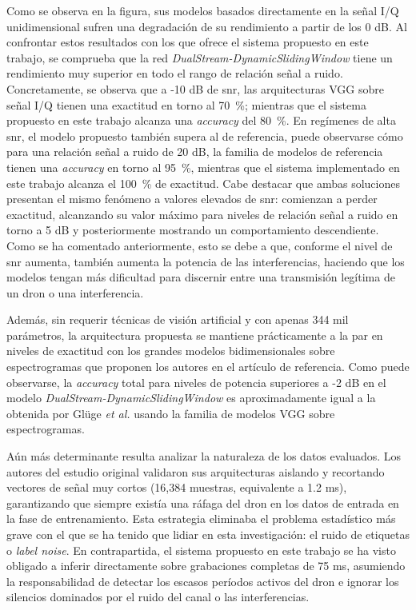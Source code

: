 Como se observa en la figura, sus modelos basados directamente en la señal I/Q unidimensional sufren una degradación de su rendimiento a partir de los 0 dB. Al confrontar estos resultados con los que ofrece el sistema propuesto en este trabajo, se comprueba que la red \textit{DualStream-DynamicSlidingWindow} tiene un rendimiento muy superior en todo el rango de relación señal a ruido. Concretamente, se observa que a -10 dB de \gls{snr}, las arquitecturas VGG sobre señal I/Q tienen una exactitud en torno al 70~\%; mientras que el sistema propuesto en este trabajo alcanza una \textit{accuracy} del 80~\%. En regímenes de alta \gls{snr}, el modelo propuesto también supera al de referencia, puede observarse cómo para una relación señal a ruido de 20 dB, la familia de modelos de referencia tienen una \textit{accuracy} en torno al 95~\%, mientras que el sistema implementado en este trabajo alcanza el 100~\% de exactitud. Cabe destacar que ambas soluciones presentan el mismo fenómeno a valores elevados de \gls{snr}: comienzan a perder exactitud, alcanzando su valor máximo para niveles de relación señal a ruido en torno a 5 dB y posteriormente mostrando un comportamiento descendiente. Como se ha comentado anteriormente, esto se debe a que, conforme el nivel de \gls{snr} aumenta, también aumenta la potencia de las interferencias, haciendo que los modelos tengan más dificultad para discernir entre una transmisión legítima de un dron o una interferencia. 

Además, sin requerir técnicas de visión artificial y con apenas 344 mil parámetros, la arquitectura propuesta se mantiene prácticamente a la par en niveles de exactitud con los grandes modelos bidimensionales sobre espectrogramas que proponen los autores en el artículo de referencia. Como puede observarse, la \textit{accuracy} total para niveles de potencia superiores a -2 dB en el modelo \textit{DualStream-DynamicSlidingWindow} es aproximadamente igual a la obtenida por Glüge \textit{et al.} usando la familia de modelos VGG sobre espectrogramas.

Aún más determinante resulta analizar la naturaleza de los datos evaluados. Los autores del estudio original validaron sus arquitecturas aislando y recortando vectores de señal muy cortos (16,384 muestras, equivalente a 1.2 ms), garantizando que siempre existía una ráfaga del dron en los datos de entrada en la fase de entrenamiento. Esta estrategia eliminaba el problema estadístico más grave con el que se ha tenido que lidiar en esta investigación: el ruido de etiquetas o \textit{label noise}. En contrapartida, el sistema propuesto en este trabajo se ha visto obligado a inferir directamente sobre grabaciones completas de 75 ms, asumiendo la responsabilidad de detectar los escasos períodos activos del dron e ignorar los silencios dominados por el ruido del canal o las interferencias.

